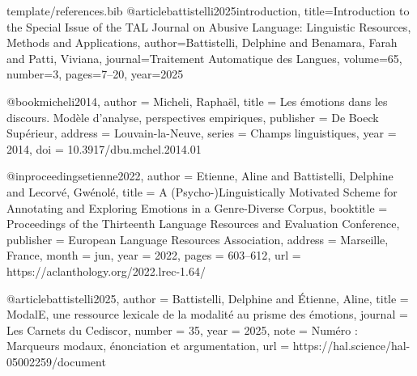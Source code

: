 \begin{filecontents*}{template/references.bib}
@article{battistelli2025introduction,
  title={Introduction to the Special Issue of the TAL Journal on Abusive Language: Linguistic Resources, Methods and Applications},
  author={Battistelli, Delphine and Benamara, Farah and Patti, Viviana},
  journal={Traitement Automatique des Langues},
  volume={65},
  number={3},
  pages={7--20},
  year={2025}
}

@book{micheli2014,
  author    = {Micheli, Rapha{\"e}l},
  title     = {Les {\'e}motions dans les discours. Mod{\`e}le d'analyse, perspectives empiriques},
  publisher = {De Boeck Sup{\'e}rieur},
  address   = {Louvain-la-Neuve},
  series    = {Champs linguistiques},
  year      = {2014},
  doi       = {10.3917/dbu.mchel.2014.01}
}

@inproceedings{etienne2022,
  author    = {Etienne, Aline and Battistelli, Delphine and Lecorv{\'e}, Gw{\'e}nol{\'e}},
  title     = {A ({P}sycho-){L}inguistically Motivated Scheme for Annotating and Exploring Emotions in a Genre-Diverse Corpus},
  booktitle = {Proceedings of the Thirteenth Language Resources and Evaluation Conference},
  publisher = {European Language Resources Association},
  address   = {Marseille, France},
  month     = jun,
  year      = {2022},
  pages     = {603--612},
  url       = {https://aclanthology.org/2022.lrec-1.64/}
}

@article{battistelli2025,
  author  = {Battistelli, Delphine and {\'E}tienne, Aline},
  title   = {{ModalE}, une ressource lexicale de la modalit{\'e} au prisme des {\'e}motions},
  journal = {Les Carnets du Cediscor},
  number  = {35},
  year    = {2025},
  note    = {Num{\'e}ro : Marqueurs modaux, {\'e}nonciation et argumentation},
  url     = {https://hal.science/hal-05002259/document}
}
\end{filecontents*}

\documentclass{template/stageOnera}
%

\usepackage[utf8]{inputenc}
\usepackage[T1]{fontenc}
\usepackage{csquotes}
\usepackage{url}
\usepackage{xcolor}
\usepackage[
  colorlinks=true,
  linkcolor=linkblue,
  citecolor=linkblue,
  urlcolor=linkblue
]{hyperref}
\usepackage[numbers]{natbib}
\usepackage[french]{babel}
\usepackage{booktabs}
\usepackage{amsmath}
\usepackage{placeins}

%




